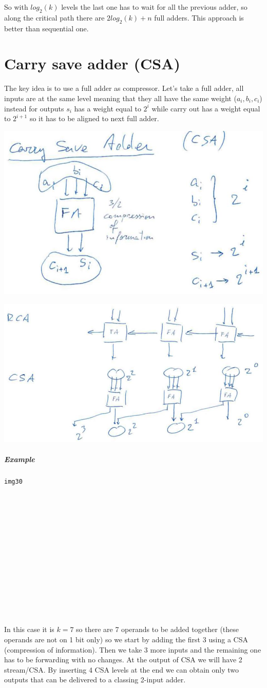 So with $log_2( k)$ levels the last one has to wait for all the previous adder, so along the critical path there are $2log_2 (k)+n$ full adders. This approach is better than sequential one.

\section{Carry save adder (CSA)}

The key idea is to use a full adder as compressor. Let's take a full adder, all inputs are at the same level meaning that they all have the same weight ($a_i,b_i, c_i$) instead for outputs $s_i$ has a weight equal to $2^i$ while carry out has a weight equal to $2^{i+1}$ so it has to be aligned to next full adder.

\begin{center}
  \includegraphics[width=0.7\linewidth]{img/img2/26}
\end{center}
\begin{center}
  \includegraphics[width=0.7\linewidth]{img/img2/27}
\end{center}

\subparagraph{Example}
\begin{verbatim}
img30














\end{verbatim}
In this case it is $k=7$ so there are 7 operands to be added together (these operands are not on 1 bit only) so we start by adding the first 3 using a CSA (compression of information). Then we take 3 more inputs and the remaining one has to be forwarding with no changes. At the output of CSA we will have 2 stream/CSA. By inserting 4 CSA levels at the end we can obtain only two outputs that can be delivered to a classing 2-input adder.\\

